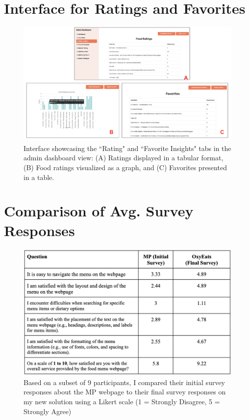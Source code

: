 \documentclass[10pt,twocolumn]{article}
\begin{document}
\section{Interface for Ratings and Favorites} \label{ratings-favorites}
\begin{figure}[H]
    \centering
    \includegraphics[width=1.\linewidth]{images/ratings-favorites.png} %
    \caption{
      Interface showcasing the ``Rating" and ``Favorite Insights" tabs in the admin dashboard view: (A) Ratings displayed in a tabular format, (B) Food ratings visualized as a graph, and (C) Favorites presented in a table.
    } 
\end{figure}

\section{Comparison of Avg. Survey Responses }\label{survey-compare}
\begin{figure}[H]
    \centering
    \includegraphics[width=1.\linewidth]{images/survey-compare2.png} %
    \caption{
        Based on a subset of 9 participants, I compared their initial survey responses about the MP webpage to their final survey responses on my new solution using a Likert scale (1 = Strongly Disagree, 5 = Strongly Agree)
    } 
\end{figure}
\end{document}
